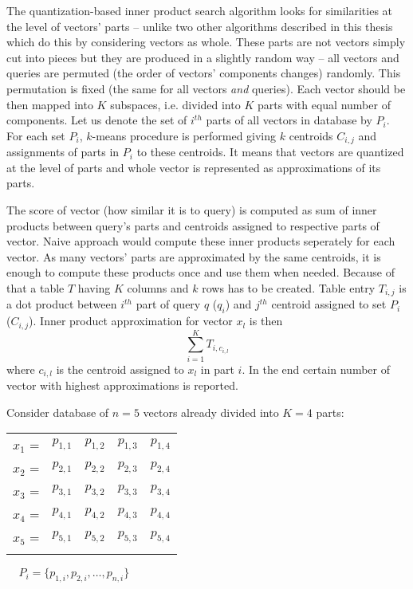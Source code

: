 The quantization-based inner product search algorithm \cite{quantization}
looks for similarities at the level of vectors' parts -- unlike two other algorithms
described in this thesis which do this by considering vectors as whole.
These parts are not vectors simply cut into pieces but they are produced in a slightly random way
 -- all vectors and queries are permuted (the order of vectors' components changes) randomly.
This permutation is fixed (the same for all vectors \textit{and} queries).
Each vector should be then mapped into $K$ subspaces, i.e. divided into $K$ parts with equal number of components.
Let us denote the set of $i^{th}$ parts of all vectors in database by $P_i$.
For each set $P_i$, $k$-means procedure is performed giving $k$ centroids $C_{i,j}$ and assignments of parts in $P_i$ to these centroids.
It means that vectors are quantized at the level of parts and whole vector is represented as
approximations of its parts.
\par
The score of vector (how similar it is to query) is computed as sum of inner products
between query's parts and centroids assigned to respective parts of vector.
Naive approach would compute these inner products seperately for each vector.
As many vectors' parts are approximated by the same centroids, it is enough to compute
these products once and use them when needed.
Because of that a table $T$ having $K$ columns and $k$ rows has to be created.
Table entry $T_{i,j}$ is a dot product between $i^{th}$ part of query $q$ ($q_i$) and $j^{th}$
centroid assigned to set $P_i$ ($C_{i,j}$).
Inner product approximation for vector $x_l$ is then
$$\sum_{i=1}^{K} T_{i,c_{i,l}}$$ where $c_{i,l}$ is the centroid assigned to $x_l$ in part $i$.
In the end certain number of vector with highest approximations is reported.

\par
Consider database of $n = 5$ vectors already divided into $K = 4$ parts:
\begin{center}
\renewcommand{\arraystretch}{1.2}
\begin{tabular}{c|c|c|c|c|}
\hhline{~----}
$x_1$ = & $p_{1,1}$ & $p_{1,2}$ & $p_{1,3}$ & $p_{1,4}$ \\
\hhline{~----}
$x_2$ = & $p_{2,1}$ & $p_{2,2}$ & $p_{2,3}$ & $p_{2,4}$ \\
\hhline{~----}
$x_3$ = & $p_{3,1}$ & $p_{3,2}$ & $p_{3,3}$ & $p_{3,4}$ \\
\hhline{~----}
$x_4$ = & $p_{4,1}$ & $p_{4,2}$ & $p_{4,3}$ & $p_{4,4}$ \\
\hhline{~----}
$x_5$ = & $p_{5,1}$ & $p_{5,2}$ & $p_{5,3}$ & $p_{5,4}$ \\
\hhline{~----}
\end{tabular}
$\ \ \ \ \ P_i = \{ p_{1,i}, p_{2,i}, \ldots, p_{n,i} \}$ \\
\end{center}

